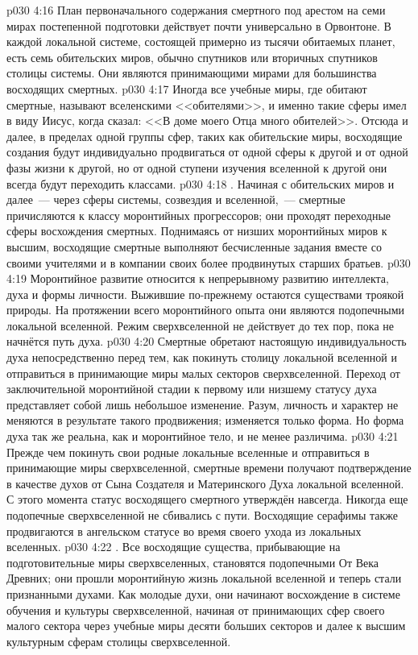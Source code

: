 \vs p030 4:16 \pc План первоначального содержания смертного под арестом на семи мирах постепенной подготовки действует почти универсально в Орвонтоне. В каждой локальной системе, состоящей примерно из тысячи обитаемых планет, есть семь обительских миров, обычно спутников или вторичных спутников столицы системы. Они являются принимающими мирами для большинства восходящих смертных.
\vs p030 4:17 Иногда все учебные миры, где обитают смертные, называют вселенскими <<обителями>>, и именно такие сферы имел в виду Иисус, когда сказал: <<В доме моего Отца много обителей>>. Отсюда и далее, в пределах одной группы сфер, таких как обительские миры, восходящие создания будут индивидуально продвигаться от одной сферы к другой и от одной фазы жизни к другой, но от одной ступени изучения вселенной к другой они всегда будут переходить классами.
\vs p030 4:18 . Начиная с обительских миров и далее~--- через сферы системы, созвездия и вселенной,~--- смертные причисляются к классу моронтийных прогрессоров; они проходят переходные сферы восхождения смертных. Поднимаясь от низших моронтийных миров к высшим, восходящие смертные выполняют бесчисленные задания вместе со своими учителями и в компании своих более продвинутых старших братьев.
\vs p030 4:19 Моронтийное развитие относится к непрерывному развитию интеллекта, духа и формы личности. Выжившие по\hyp{}прежнему остаются существами троякой природы. На протяжении всего моронтийного опыта они являются подопечными локальной вселенной. Режим сверхвселенной не действует до тех пор, пока не начнётся путь духа.
\vs p030 4:20 Смертные обретают настоящую индивидуальность духа непосредственно перед тем, как покинуть столицу локальной вселенной и отправиться в принимающие миры малых секторов сверхвселенной. Переход от заключительной моронтийной стадии к первому или низшему статусу духа представляет собой лишь небольшое изменение. Разум, личность и характер не меняются в результате такого продвижения; изменяется только форма. Но форма духа так же реальна, как и моронтийное тело, и не менее различима.
\vs p030 4:21 Прежде чем покинуть свои родные локальные вселенные и отправиться в принимающие миры сверхвселенной, смертные времени получают подтверждение в качестве духов от Сына Создателя и Материнского Духа локальной вселенной. С этого момента статус восходящего смертного утверждён навсегда. Никогда еще подопечные сверхвселенной не сбивались с пути. Восходящие серафимы также продвигаются в ангельском статусе во время своего ухода из локальных вселенных.
\vs p030 4:22 . Все восходящие существа, прибывающие на подготовительные миры сверхвселенных, становятся подопечными От Века Древних; они прошли моронтийную жизнь локальной вселенной и теперь стали признанными духами. Как молодые духи, они начинают восхождение в системе обучения и культуры сверхвселенной, начиная от принимающих сфер своего малого сектора через учебные миры десяти больших секторов и далее к высшим культурным сферам столицы сверхвселенной.
